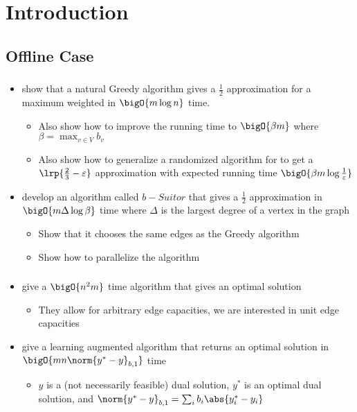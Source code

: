 \section{Introduction}

\subsection{Offline Case}
\subsubsection{\maxweightbmatch{}}
\begin{itemize}[label=--]
    \item \cite{mestre2006greedy} show that a natural Greedy algorithm gives a $\frac{1}{2}$ approximation for a 
    maximum weighted \bmatch{} in $\bigO{m \log n}$ time. 
    \begin{itemize}[label=--]
        \item Also show how to improve the running time to $\bigO{\beta m}$ where $\beta = \max_{v \in V} b_v$
        \item Also show how to generalize a randomized algorithm for \match{} to get a $\lrp{\frac{2}{3} - \varepsilon}$ 
        approximation with expected running time $\bigO{\beta m \log \frac{1}{\varepsilon}}$ 
    \end{itemize}
    \item \cite{khan2016efficient} develop an algorithm called $b-Suitor$ that gives a $\frac{1}{2}$ approximation in $\bigO{m \Delta \log \beta}$
    time where $\Delta$ is the largest degree of a vertex in the graph
    \begin{itemize}[label=--]
        \item Show that it chooses the same edges as the Greedy algorithm 
        \item Show how to parallelize the algorithm
    \end{itemize}
\end{itemize}

\subsubsection{\mincostbmatch{}}
\begin{itemize}[label=--]
    \item \cite{miller1995staged} give a $\bigO{n^2m}$ time algorithm that gives an optimal solution 
    \begin{itemize}[label=--]
        \item They allow for arbitrary edge capacities, we are interested in unit edge capacities
    \end{itemize}
    \item \cite{dinitz2021learned} give a learning augmented algorithm that returns an optimal solution in $\bigO{mn \norm{y^* - y}_{b,1}}$ time 
    \begin{itemize}[label=--]
        \item $y$ is a (not necessarily feasible) dual solution, $y^{\ast}$ is an optimal dual solution, and $\norm{y^* - y}_{b,1} = \sum_{i} b_i \abs{y_i^* -  y_i}$ 
    \end{itemize}
\end{itemize}

